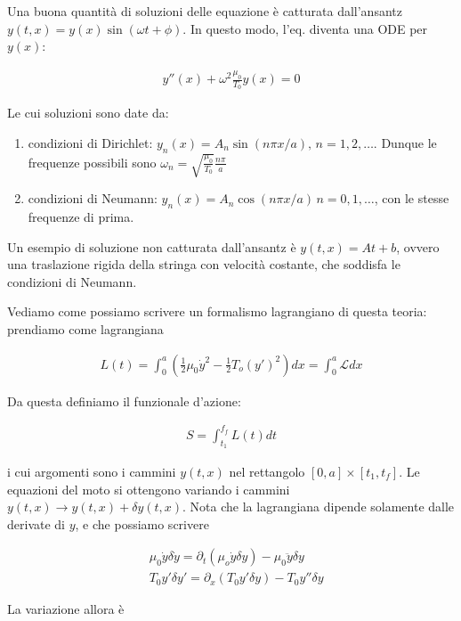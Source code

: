 \documentclass{report}
\begin{document}
Una buona quantità di soluzioni delle equazione è catturata dall'ansantz \(y(t,x) = y(x)\sin(\omega t +\phi)\). In questo modo, l'eq. diventa una ODE per \(y(x)\): 

\begin{align}
    y''(x) + \omega^2\frac{\mu_0}{T_0}y(x) = 0 
\end{align}

Le cui soluzioni sono date da: 

\begin{enumerate}
    \item condizioni di Dirichlet: \(y_n(x) = A_n\sin(n\pi x/a), \, n=1,2, \ldots\). Dunque le frequenze possibili sono \(\omega_n = \sqrt{\frac{\mu_0}{T_0}}\frac{n\pi}{a}\)
    \item condizioni di Neumann: \(y_n(x) = A_n\cos(n\pi x/a)\, n =0,1, \ldots\), con le stesse frequenze di prima. 
\end{enumerate}

Un esempio di soluzione non catturata dall'ansantz è \(y(t,x) = At+b\), ovvero una traslazione rigida della stringa con velocità costante, che soddisfa le condizioni di Neumann. 

Vediamo come possiamo scrivere un formalismo lagrangiano di questa teoria: prendiamo come lagrangiana 

\begin{align}
    L(t) = \int_0^a \left(\frac{1}{2}\mu_0 \dot{y}^2 - \frac{1}{2}T_o (y')^2 \right)dx = \int_0^a \mathcal{L}dx
\end{align}

Da questa definiamo il funzionale d'azione: 

\begin{align}
    S = \int_{t_1}^{f_f}L(t)dt
\end{align}

i cui argomenti sono i cammini \(y(t, x)\) nel rettangolo \([0, a]\times [t_1, t_f]\). Le equazioni del moto si ottengono variando i cammini \(y(t,x) \rightarrow y(t,x) + \delta y(t,x)\). Nota che la lagrangiana dipende solamente dalle derivate di \(y\), e che possiamo scrivere

\begin{align}
    &\mu_0 \dot{y}\delta\dot{y} = \partial_t(\mu_o \dot{y}\delta y) - \mu_0\ddot{y}\delta y \\
    &T_0y'\delta y' = \partial_x (T_0 y' \delta y) - T_0 y'' \delta y
\end{align}

La variazione allora è 
\end{document}
